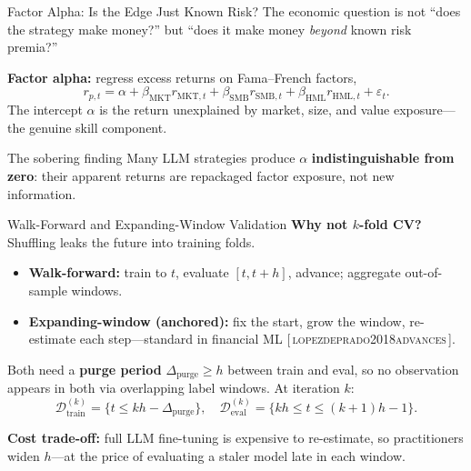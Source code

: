 \documentclass[9pt,t]{beamer}
\newcommand{\citesrc}[1]{\textsc{\small #1}}
\providecommand{\citep}[1]{{\footnotesize[\,\citesrc{#1}\,]}}
\begin{document}
\begin{frame}{Factor Alpha: Is the Edge Just Known Risk?}
The economic question is not ``does the strategy make money?'' but ``does it
make money \emph{beyond} known risk premia?''

\medskip
\textbf{Factor alpha:} regress excess returns on Fama--French factors,
\[
  r_{p,t} = \alpha + \beta_{\text{MKT}}r_{\text{MKT},t}
  + \beta_{\text{SMB}}r_{\text{SMB},t} + \beta_{\text{HML}}r_{\text{HML},t} + \varepsilon_t.
\]
The intercept $\alpha$ is the return unexplained by market, size, and value
exposure---the genuine skill component.

\medskip
\begin{alertblock}{The sobering finding}
Many LLM strategies produce $\alpha$ \textbf{indistinguishable from zero}: their
apparent returns are repackaged factor exposure, not new information.
\end{alertblock}
\end{frame}

\begin{frame}{Walk-Forward and Expanding-Window Validation}
\textbf{Why not $k$-fold CV?} Shuffling leaks the future into training folds.

\medskip
\begin{itemize}
  \item \textbf{Walk-forward:} train to $t$, evaluate $[t, t{+}h]$, advance; aggregate
        out-of-sample windows.
  \item \textbf{Expanding-window (anchored):} fix the start, grow the window,
        re-estimate each step---standard in financial ML
        \citep{lopezdeprado2018advances}.
\end{itemize}

\medskip
\begin{underhood}
Both need a \textbf{purge period} $\Delta_{\text{purge}} \geq h$ between train and
eval, so no observation appears in both via overlapping label windows. At
iteration $k$:
\[
  \mathcal{D}_{\text{train}}^{(k)} = \{t \leq kh - \Delta_{\text{purge}}\},\quad
  \mathcal{D}_{\text{eval}}^{(k)}  = \{kh \leq t \leq (k{+}1)h - 1\}.
\]
\end{underhood}

\medskip
\textbf{Cost trade-off:} full LLM fine-tuning is expensive to re-estimate, so
practitioners widen $h$---at the price of evaluating a staler model late in each
window.
\end{frame}
\end{document}
